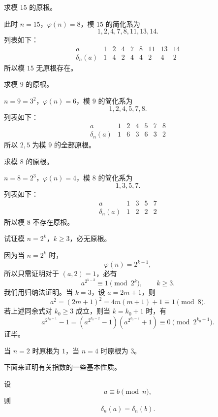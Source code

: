 \begin{example}[原文 例 2]
	求模 $15$ 的原根。

	此时 $n=15$，$\varphi(n)=8$，模 $15$ 的简化系为
	\[
		1,2,4,7,8,11,13,14.
	\]
	列表如下：
	\[
	\begin{array}{c|cccccccc}
		a & 1 & 2 & 4 & 7 & 8 & 11 & 13 & 14\\ \hline
		\delta_n(a) & 1 & 4 & 2 & 4 & 4 & 2 & 4 & 2
	\end{array}
	\]
	所以模 $15$ 无原根存在。
\end{example}

\begin{example}[原文 例 3]
	求模 $9$ 的原根。

	$n=9=3^2$，$\varphi(n)=6$，模 $9$ 的简化系为
	\[
		1,2,4,5,7,8.
	\]
	列表如下：
	\[
	\begin{array}{c|cccccc}
		a & 1 & 2 & 4 & 5 & 7 & 8\\ \hline
		\delta_n(a) & 1 & 6 & 3 & 6 & 3 & 2
	\end{array}
	\]
	所以 $2,5$ 为模 $9$ 的全部原根。
\end{example}

\begin{example}[原文 例 4]
	求模 $8$ 的原根。

	$n=8=2^3$，$\varphi(n)=4$，模 $8$ 的简化系为
	\[
		1,3,5,7.
	\]
	列表如下：
	\[
	\begin{array}{c|cccc}
		a & 1 & 3 & 5 & 7\\ \hline
		\delta_n(a) & 1 & 2 & 2 & 2
	\end{array}
	\]
	所以模 $8$ 不存在原根。
\end{example}

\begin{example}[原文 例 5]
	试证模 $n=2^k$，$k\geq 3$，必无原根。

	因为当 $n=2^k$ 时，
	\[
		\varphi(n)=2^{k-1},
	\]
	所以只需证明对于 $(a,2)=1$，必有
	\[
		a^{2^{k-2}}\equiv 1\pmod{2^k},
		\qquad k\geq 3.
	\]
	我们用归纳法证明。当 $k=3$，设 $a=2m+1$，则
	\[
		a^2=(2m+1)^2=4m(m+1)+1\equiv 1\pmod 8.
	\]
	若上述同余式对 $k_0\geq 3$ 成立，则当 $k=k_0+1$ 时，有
	\[
		a^{2^{k_0-1}}-1
		=
		\left(a^{2^{k_0-2}}-1\right)
		\left(a^{2^{k_0-2}}+1\right)
		\equiv 0\pmod{2^{k_0+1}}.
	\]
	证毕。
\end{example}

当 $n=2$ 时原根为 $1$，当 $n=4$ 时原根为 $3$。

下面来证明有关指数的一些基本性质。

\begin{theorem}[原文 定理 1]
	设
	\[
		a\equiv b\pmod n,
	\]
	则
	\[
		\delta_n(a)=\delta_n(b).
	\]
\end{theorem}

